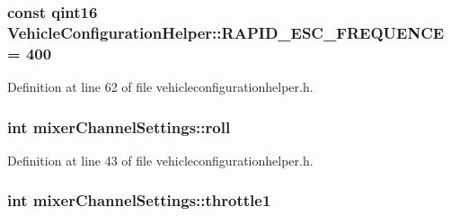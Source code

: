\hypertarget{group___vehicle_configuration_helper_ga5bdfa86a19f74eae8f6b44ac63d640f2}{
\subsubsection[{\-R\-A\-P\-I\-D\-\_\-\-E\-S\-C\-\_\-\-F\-R\-E\-Q\-U\-E\-N\-C\-E}]{\setlength{\rightskip}{0pt plus 5cm}const qint16 {\bf \-Vehicle\-Configuration\-Helper\-::\-R\-A\-P\-I\-D\-\_\-\-E\-S\-C\-\_\-\-F\-R\-E\-Q\-U\-E\-N\-C\-E} = 400}}\label{group___vehicle_configuration_helper_ga5bdfa86a19f74eae8f6b44ac63d640f2}


\-Definition at line 62 of file vehicleconfigurationhelper.\-h.

\hypertarget{group___vehicle_configuration_helper_ga41061bf67fafdf170291f3a518268645}{
\subsubsection[{roll}]{\setlength{\rightskip}{0pt plus 5cm}int {\bf mixer\-Channel\-Settings\-::roll}}}\label{group___vehicle_configuration_helper_ga41061bf67fafdf170291f3a518268645}


\-Definition at line 43 of file vehicleconfigurationhelper.\-h.

\hypertarget{group___vehicle_configuration_helper_ga938151d1ab96457978b7689a772b1d2f}{
\subsubsection[{throttle1}]{\setlength{\rightskip}{0pt plus 5cm}int {\bf mixer\-Channel\-Settings\-::throttle1}}}\label{group___vehicle_configuration_helper_ga938151d1ab96457978b7689a772b1d2f}


